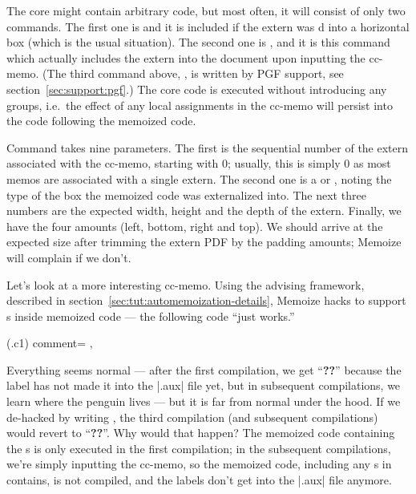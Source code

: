 \documentclass[a4paper,11pt]{article}
\begin{document}
The core might contain arbitrary code, but most often, it will consist of only
two commands.  The first one is  and it is included if the
extern was d into a horizontal box (which is the usual
situation).  The second one is , and it is this
command which actually includes the extern into the document upon inputting the
cc-memo.  (The third command above, , is written
by PGF support, see section~\ref{sec:support:pgf}.) The core code is executed
without introducing any groups, i.e.\ the effect of any local assignments in
the cc-memo will persist into the code following the memoized code.

Command  takes nine parameters.  The first is the
sequential number of the extern associated with the cc-memo, starting with 0;
usually, this is simply 0 as most memos are associated with a single extern.
The second one is a  or , noting the type of the box
the memoized code was externalized into.  The next three numbers are the
expected width, height and the depth of the extern.  Finally, we have the four
 amounts (left, bottom, right and top).  We should arrive at
the expected size after trimming the extern PDF by the
padding amounts; Memoize will complain if we don't.

Let's look at a more interesting cc-memo.  Using the advising framework,
described in section~\ref{sec:tut:automemoization-details}, Memoize hacks
 to support s inside memoized code --- the following
code ``just works.''

(.c1){
  comment={\centering
    \quad
    \quad
  },
}

Everything seems normal --- after the first compilation, we get ``\textbf{??}''
because the label has not made it into the |.aux| file yet, but in subsequent
compilations, we learn where the penguin lives --- but it is far from normal
under the hood. If we de-hacked  by writing
, the third compilation
(and subsequent compilations) would revert to ``\textbf{??}''.  Why would that
happen?  The memoized code containing the s is only executed in the
first compilation; in the subsequent compilations, we're simply inputting the
cc-memo, so the memoized code, including any s in contains, is not
compiled, and the labels don't get into the |.aux| file anymore.
\end{document}
